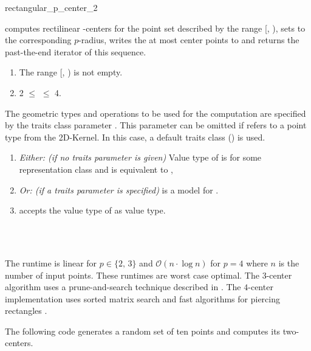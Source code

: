\begin{ccRefFunction}{rectangular_p_center_2}
  
  computes rectilinear -centers for the point set described by
  the range [, ), sets  to the corresponding
  $p$-radius, writes the at most  center points to  and
  returns the past-the-end iterator of this sequence.
  
  \ccPrecond
  \begin{enumerate}
  \item The range [, ) is not empty.
  \item 2 $\le$  $\le$ 4.
  \end{enumerate}
  
  The geometric types and operations to be used for the computation
  are specified by the traits class parameter . This parameter
  can be omitted if  refers to a point type from
  the 2D-Kernel. In this case, a default traits class
  () is used.
  
  \ccRequire
  \begin{enumerate}
  \item \textit{Either: (if no traits parameter is given)} Value type
    of  is  for some
    representation class  and  is equivalent to
    ,
  \item \textit{Or: (if a traits parameter is specified)} 
    is a model for .
  \item {} accepts the value type of
     as value type.
  \end{enumerate}  
  
  \ccSeeAlso
  \\
  \\
  
  \ccImplementation The runtime is linear for $p \in \{2,\,3\}$ and
  $\mathcal{O}(n \cdot \log n)$ for $p = 4$ where $n$ is the number of
  input points. These runtimes are worst case optimal. The $3$-center
  algorithm uses a prune-and-search technique described in
  \cite{h-slacr-99}.  The $4$-center implementation uses sorted matrix
  search \cite{fj-fkppc-83,fj-gsrsm-84} and fast algorithms for
  piercing rectangles \cite{sw-rpppp-96}.
  
  \ccExample The following code generates a random set of ten points
  and computes its two-centers.

\end{ccRefFunction}

